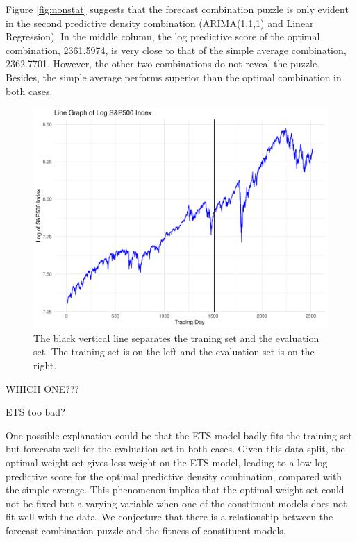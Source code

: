 \documentclass{monashthesis}
\begin{document}
Figure \ref{fig:nonstat} suggests that the forecast combination puzzle is only evident in the second predictive density combination (ARIMA(1,1,1) and Linear Regression). In the middle column, the log predictive score of the optimal combination, 2361.5974, is very close to that of the simple average combination, 2362.7701. However, the other two combinations do not reveal the puzzle. Besides, the simple average performs superior than the optimal combination in both cases.

\begin{figure}[ht]
\centering
\includegraphics[scale=0.4]{figures/log_linegraph.pdf}
\caption{The black vertical line separates the traning set and the evaluation set. The training set is on the left and the evaluation set is on the right.}
\label{fig:llg}
\end{figure}

WHICH ONE???

ETS too bad?

One possible explanation could be that the ETS model badly fits the training set but forecasts well for the evaluation set in both cases. Given this data split, the optimal weight set gives less weight on the ETS model, leading to a low log predictive score for the optimal predictive density combination, compared with the simple average. This phenomenon implies that the optimal weight set could not be fixed but a varying variable when one of the constituent models does not fit well with the data. We conjecture that there is a relationship between the forecast combination puzzle and the fitness of constituent models.
\end{document}
